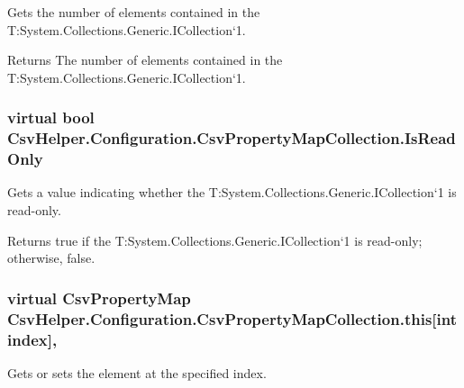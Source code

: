 Gets the number of elements contained in the T\-:\-System.\-Collections.\-Generic.\-I\-Collection`1. 

\begin{DoxyReturn}{Returns}
The number of elements contained in the T\-:\-System.\-Collections.\-Generic.\-I\-Collection`1. 
\end{DoxyReturn}
\hypertarget{a00049_a992f4d0757c470445df63e94db9ce9b9}{
\subsubsection[{Is\-Read\-Only}]{\setlength{\rightskip}{0pt plus 5cm}virtual bool Csv\-Helper.\-Configuration.\-Csv\-Property\-Map\-Collection.\-Is\-Read\-Only\hspace{0.3cm}{\ttfamily [get]}}}\label{a00049_a992f4d0757c470445df63e94db9ce9b9}


Gets a value indicating whether the T\-:\-System.\-Collections.\-Generic.\-I\-Collection`1 is read-\/only. 

\begin{DoxyReturn}{Returns}
true if the T\-:\-System.\-Collections.\-Generic.\-I\-Collection`1 is read-\/only; otherwise, false. 
\end{DoxyReturn}
\hypertarget{a00049_a55e031211272c5a4844f054e2fa34b1d}{
\subsubsection[{this[int index]}]{\setlength{\rightskip}{0pt plus 5cm}virtual {\bf Csv\-Property\-Map} Csv\-Helper.\-Configuration.\-Csv\-Property\-Map\-Collection.\-this\mbox{[}int index\mbox{]}\hspace{0.3cm}{\ttfamily [get]}, {\ttfamily [set]}}}\label{a00049_a55e031211272c5a4844f054e2fa34b1d}


Gets or sets the element at the specified index. 

